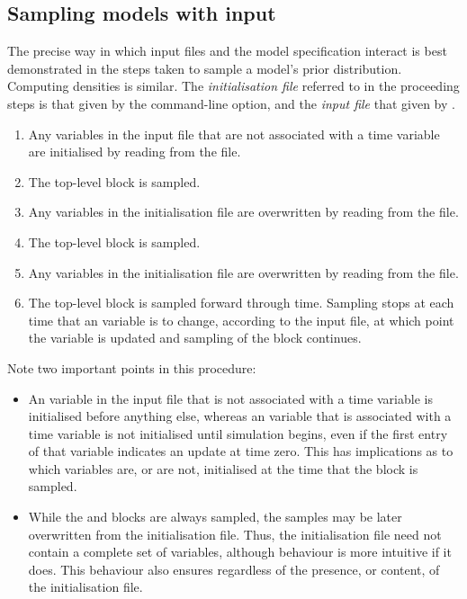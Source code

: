 \subsection{Sampling models with input\label{Sampling_models_with_input}}

The precise way in which input files and the model specification interact is
best demonstrated in the steps taken to sample a model's prior
distribution. Computing densities is similar. The \emph{initialisation file}
referred to in the proceeding steps is that given by the 
command-line option, and the \emph{input file} that given by
.
\begin{enumerate}
\item Any  variables in the input file that are not associated with
  a time variable are initialised by reading from the file.
\item The  top-level block is sampled.
\item Any  variables in the initialisation file are overwritten
  by reading from the file.
\item The  top-level block is sampled.
\item Any  variables in the initialisation file are overwritten
  by reading from the file.
\item The  top-level block is sampled forward through
  time. Sampling stops at each time that an  variable is to
  change, according to the input file, at which point the 
  variable is updated and sampling of the  block
  continues.
\end{enumerate}

Note two important points in this procedure:
\begin{itemize}
\item An  variable in the input file that is not associated with a
  time variable is initialised before anything else, whereas an 
  variable that is associated with a time variable is not initialised until
  simulation begins, even if the first entry of that variable indicates an
  update at time zero. This has implications as to which 
  variables are, or are not, initialised at the time that the
   block is sampled.
\item While the  and  blocks are always
  sampled, the samples may be later overwritten from the initialisation
  file. Thus, the initialisation file need not contain a complete set of
  variables, although behaviour is more intuitive if it does. This behaviour
  also ensures  regardless of the presence, or content, of the
  initialisation file.
\end{itemize}

